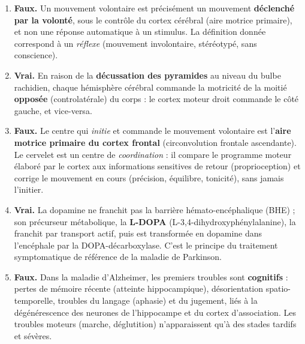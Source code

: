\documentclass[11pt]{article}
\begin{document}
\begin{corrige}
\begin{enumerate}
\item \textbf{Faux.} Un mouvement volontaire est précisément un mouvement \textbf{déclenché par la volonté}, sous le contrôle du cortex cérébral (aire motrice primaire), et non une réponse automatique à un stimulus. La définition donnée correspond à un \emph{réflexe} (mouvement involontaire, stéréotypé, sans conscience).
\item \textbf{Vrai.} En raison de la \textbf{décussation des pyramides} au niveau du bulbe rachidien, chaque hémisphère cérébral commande la motricité de la moitié \textbf{opposée} (controlatérale) du corps : le cortex moteur droit commande le côté gauche, et vice-versa.
\item \textbf{Faux.} Le centre qui \emph{initie} et commande le mouvement volontaire est l'\textbf{aire motrice primaire du cortex frontal} (circonvolution frontale ascendante). Le cervelet est un centre de \emph{coordination} : il compare le programme moteur élaboré par le cortex aux informations sensitives de retour (proprioception) et corrige le mouvement en cours (précision, équilibre, tonicité), sans jamais l'initier.
\item \textbf{Vrai.} La dopamine ne franchit pas la barrière hémato-encéphalique (BHE) ; son précurseur métabolique, la \textbf{L-DOPA} (L-3,4-dihydroxyphénylalanine), la franchit par transport actif, puis est transformée en dopamine dans l'encéphale par la DOPA-décarboxylase. C'est le principe du traitement symptomatique de référence de la maladie de Parkinson.
\item \textbf{Faux.} Dans la maladie d'Alzheimer, les premiers troubles sont \textbf{cognitifs} : pertes de mémoire récente (atteinte hippocampique), désorientation spatio-temporelle, troubles du langage (aphasie) et du jugement, liés à la dégénérescence des neurones de l'hippocampe et du cortex d'association. Les troubles moteurs (marche, déglutition) n'apparaissent qu'à des stades tardifs et sévères.
\end{enumerate}
\end{corrige}
\end{document}
